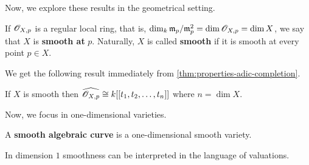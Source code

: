 Now, we explore these results in the geometrical setting. 
\begin{definition}\label{def:}
	If ${\mathscr O}_{X,p}$ is a regular local ring, that is, $\dim_{k} \mathfrak{m}_{p}/\mathfrak{m}_{p}^{2} = \dim {\mathscr O}_{X,p} = \dim X$, we say that $X$ is \textbf{smooth at} $p$. Naturally, $X$ is called \textbf{smooth} if it is smooth at every point $p\in X$.
\end{definition}
We get the following result immediately from \cref{thm:properties-adic-completion}.
\begin{corollary}\label{cor:smooth-iff-isomorphic-to-power-series}
	If $X$ is smooth then $\widehat{{\mathscr O}_{X,p}} \cong k[[t_{1}, t_{2}, \ldots, t_{n}]]$ where $n = \dim X$.
\end{corollary}
Now, we focus in one-dimensional varieties.
\begin{definition}\label{def:algebraic-curve}
	A \textbf{smooth algebraic curve} is a one-dimensional smooth variety.
\end{definition}
In dimension $1$ smoothness can be interpreted in the language of valuations.
